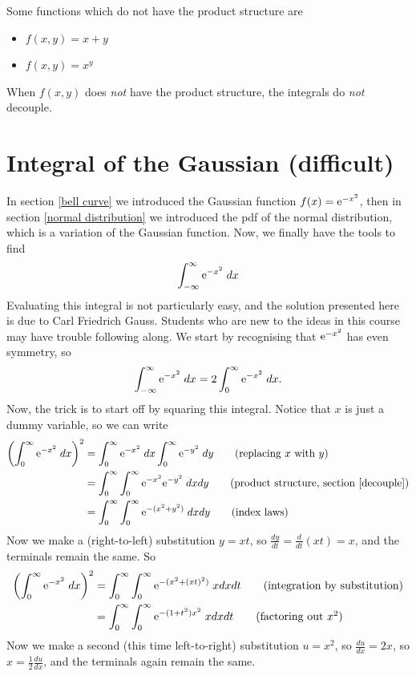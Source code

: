 \noindent Some functions which do not have the product structure are
\begin{itemize}
\item $f(x,y) = x + y$
\item $f(x,y) = x^y$
\end{itemize}
When $f(x,y)$ does \textit{not} have the product structure, the integrals do \textit{not} decouple.

\section{Integral of the Gaussian (difficult)}
In section \ref{bell curve} we introduced the Gaussian function $f(x) = \mathrm{e}^{-x^2}$, then in section \ref{normal distribution} we introduced the pdf of the normal distribution, which is a variation of the Gaussian function. Now, we finally have the tools to find
\[
\int_{-\infty}^\infty \mathrm{e}^{-x^2} \; dx
\]
Evaluating this integral is not particularly easy, and the solution presented here is due to Carl Friedrich Gauss. Students who are new to the ideas in this course may have trouble following along. We start by recognising that $\mathrm{e}^{-x^2}$ has even symmetry, so
\[
\int_{-\infty}^\infty \mathrm{e}^{-x^2} \; dx = 2\int_0^\infty \mathrm{e}^{-x^2} \; dx.
\]
Now, the trick is to start off by squaring this integral. Notice that $x$ is just a dummy variable, so we can write
\begin{align*}
\brac{\int_0^\infty \e^{-x^2} \; dx}^2 & = \int_0^\infty \e^{-x^2} \; dx \int_0^\infty \e^{-y^2} \; dy  \tag{replacing $x$ with $y$}\\
		& = \int_0^\infty \int_0^\infty \e^{-x^2}\e^{-y^2} \; dxdy \tag{product structure, section \ref{decouple}} \\
		& =  \int_0^\infty \int_0^\infty \e^{-(x^2 + y^2)} \; dxdy \tag{index laws}
\end{align*}
Now we make a (right-to-left) substitution $y = xt$, so $\frac{dy}{dt} = \frac{d}{dt}(xt) = x$, and the terminals remain the same. So
\begin{align*}
\left(\int_0^\infty \mathrm{e}^{-x^2} \; dx\right)^2 & = \int_0^\infty \int_0^\infty \mathrm{e}^{-(x^2 + (xt)^2)} \; x dxdt \tag{integration by substitution} \\
	& = \int_0^\infty \int_0^\infty \mathrm{e}^{-(1 + t^2)x^2} \; x dxdt \tag{factoring out $x^2$}
\end{align*}
Now we make a second (this time left-to-right) substitution $u = x^2$, so $\frac{du}{dx} = 2x$, so $x = \frac{1}{2}\frac{du}{dx}$, and the terminals again remain the same.
